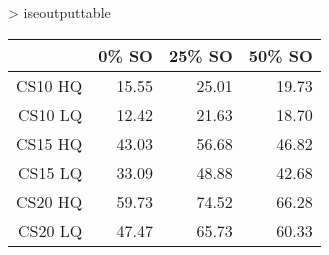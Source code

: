 > iseoutputtable
\begin{table}[ht]
\begin{center}
\begin{tabular}{rrrr}
  \hline
 & 0\% SO & 25\% SO & 50\% SO \\
  \hline
CS10 HQ & 15.55 & 25.01 & 19.73 \\
  CS10 LQ & 12.42 & 21.63 & 18.70 \\
  CS15 HQ & 43.03 & 56.68 & 46.82 \\
  CS15 LQ & 33.09 & 48.88 & 42.68 \\
  CS20 HQ & 59.73 & 74.52 & 66.28 \\
  CS20 LQ & 47.47 & 65.73 & 60.33 \\
   \hline
\end{tabular}
\end{center}
\end{table}


